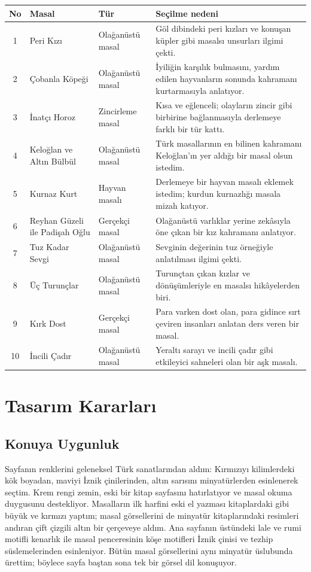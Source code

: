 \documentclass[12pt,a4paper]{article}
\begin{document}
\begin{longtable}{@{}cp{4cm}p{3cm}p{5.4cm}@{}}
\toprule
\textbf{No} & \textbf{Masal} & \textbf{Tür} & \textbf{Seçilme nedeni} \\
\midrule
\endhead
1 & Peri Kızı & Olağanüstü masal & Göl dibindeki peri kızları ve konuşan küpler gibi masalsı unsurları ilgimi çekti. \\
2 & Çobanla Köpeği & Olağanüstü masal & İyiliğin karşılık bulmasını, yardım edilen hayvanların sonunda kahramanı kurtarmasıyla anlatıyor. \\
3 & İnatçı Horoz & Zincirleme masal & Kısa ve eğlenceli; olayların zincir gibi birbirine bağlanmasıyla derlemeye farklı bir tür kattı. \\
4 & Keloğlan ve Altın Bülbül & Olağanüstü masal & Türk masallarının en bilinen kahramanı Keloğlan'ın yer aldığı bir masal olsun istedim. \\
5 & Kurnaz Kurt & Hayvan masalı & Derlemeye bir hayvan masalı eklemek istedim; kurdun kurnazlığı masala mizah katıyor. \\
6 & Reyhan Güzeli ile Padişah Oğlu & Gerçekçi masal & Olağanüstü varlıklar yerine zekâsıyla öne çıkan bir kız kahramanı anlatıyor. \\
7 & Tuz Kadar Sevgi & Olağanüstü masal & Sevginin değerinin tuz örneğiyle anlatılması ilgimi çekti. \\
8 & Üç Turunçlar & Olağanüstü masal & Turunçtan çıkan kızlar ve dönüşümleriyle en masalsı hikâyelerden biri. \\
9 & Kırk Dost & Gerçekçi masal & Para varken dost olan, para gidince sırt çeviren insanları anlatan ders veren bir masal. \\
10 & İncili Çadır & Olağanüstü masal & Yeraltı sarayı ve incili çadır gibi etkileyici sahneleri olan bir aşk masalı. \\
\bottomrule
\end{longtable}

\section{Tasarım Kararları}

\subsection{Konuya Uygunluk}
Sayfanın renklerini geleneksel Türk sanatlarından aldım: Kırmızıyı kilimlerdeki kök boyadan, maviyi İznik çinilerinden, altın sarısını minyatürlerden esinlenerek seçtim. Krem rengi zemin, eski bir kitap sayfasını hatırlatıyor ve masal okuma duygusunu destekliyor. Masalların ilk harfini eski el yazması kitaplardaki gibi büyük ve kırmızı yaptım; masal görsellerini de minyatür kitaplarındaki resimleri andıran çift çizgili altın bir çerçeveye aldım. Ana sayfanın üstündeki lale ve rumi motifli kenarlık ile masal penceresinin köşe motifleri İznik çinisi ve tezhip süslemelerinden esinleniyor. Bütün masal görsellerini aynı minyatür üslubunda ürettim; böylece sayfa baştan sona tek bir görsel dil konuşuyor.
\end{document}
